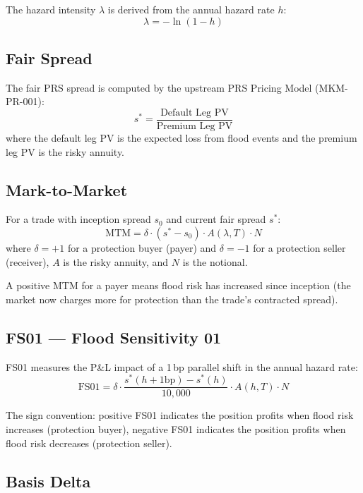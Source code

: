 \documentclass[11pt,a4paper]{article}
\begin{document}
The hazard intensity $\lambda$ is derived from the annual hazard rate $h$:
\begin{equation}
    \lambda = -\ln(1 - h)
\end{equation}

\subsection{Fair Spread}

The fair PRS spread is computed by the upstream PRS Pricing Model (MKM-PR-001):
\begin{equation}
    s^* = \frac{\text{Default Leg PV}}{\text{Premium Leg PV}}
\end{equation}
where the default leg PV is the expected loss from flood events and the premium leg PV is the risky annuity.

\subsection{Mark-to-Market}

For a trade with inception spread $s_0$ and current fair spread $s^*$:
\begin{equation}
    \text{MTM} = \delta \cdot (s^* - s_0) \cdot A(\lambda, T) \cdot N
\end{equation}
where $\delta = +1$ for a protection buyer (payer) and $\delta = -1$ for a protection seller (receiver), $A$ is the risky annuity, and $N$ is the notional.

A positive MTM for a payer means flood risk has increased since inception (the market now charges more for protection than the trade's contracted spread).

\subsection{FS01 --- Flood Sensitivity 01}

FS01 measures the P\&L impact of a 1\,bp parallel shift in the annual hazard rate:
\begin{equation}
    \text{FS01} = \delta \cdot \frac{s^*(h + 1\text{bp}) - s^*(h)}{10{,}000} \cdot A(h, T) \cdot N
\end{equation}

The sign convention: positive FS01 indicates the position profits when flood risk increases (protection buyer), negative FS01 indicates the position profits when flood risk decreases (protection seller).

\subsection{Basis Delta}
\end{document}
